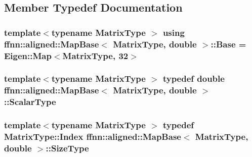 \subsection{Member Typedef Documentation}
\hypertarget{structffnn_1_1aligned_1_1_map_base_3_01_matrix_type_00_01double_01_4_a7671de2c0e41dda47c45d4c221d046dd}{
\subsubsection[{Base}]{\setlength{\rightskip}{0pt plus 5cm}template$<$typename Matrix\-Type $>$ using {\bf ffnn\-::aligned\-::\-Map\-Base}$<$ Matrix\-Type, double $>$\-::{\bf Base} =  Eigen\-::\-Map$<$Matrix\-Type, 32$>$}}\label{structffnn_1_1aligned_1_1_map_base_3_01_matrix_type_00_01double_01_4_a7671de2c0e41dda47c45d4c221d046dd}
\hypertarget{structffnn_1_1aligned_1_1_map_base_3_01_matrix_type_00_01double_01_4_ae77ad8b86ea2659f96c1a9f1f40e1371}{
\subsubsection[{Scalar\-Type}]{\setlength{\rightskip}{0pt plus 5cm}template$<$typename Matrix\-Type $>$ typedef double {\bf ffnn\-::aligned\-::\-Map\-Base}$<$ Matrix\-Type, double $>$\-::{\bf Scalar\-Type}}}\label{structffnn_1_1aligned_1_1_map_base_3_01_matrix_type_00_01double_01_4_ae77ad8b86ea2659f96c1a9f1f40e1371}
\hypertarget{structffnn_1_1aligned_1_1_map_base_3_01_matrix_type_00_01double_01_4_a45b1c5c40d30eda6790513ed59d472a2}{
\subsubsection[{Size\-Type}]{\setlength{\rightskip}{0pt plus 5cm}template$<$typename Matrix\-Type $>$ typedef Matrix\-Type\-::\-Index {\bf ffnn\-::aligned\-::\-Map\-Base}$<$ Matrix\-Type, double $>$\-::{\bf Size\-Type}}}\label{structffnn_1_1aligned_1_1_map_base_3_01_matrix_type_00_01double_01_4_a45b1c5c40d30eda6790513ed59d472a2}


